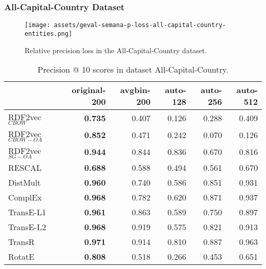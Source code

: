 \documentclass[11pt,titlepage,oneside,openany]{book}
\begin{document}
\newpage

\subsubsection{All-Capital-Country Dataset}
\label{subsubsec:geval-results-semana-all-capital-country-entities}

\begin{figure}[h!]
    \centering
    \texttt{[image: assets/geval-semana-p-loss-all-capital-country-entities.png]}
    \vspace*{-3mm}
    \caption{Relative precision loss in the All-Capital-Country dataset.}
    \label{fig:geval-semana-p-loss-all-capital-country-entities}
\end{figure}


\begin{table}[H]
\centering
\begin{tabular}{lrrrrr}
\toprule
{} &  original-200 &  avgbin-200 &  auto-128 &  auto-256 &  auto-512 \\
\midrule
RDF2vec$_{CBOW}$     &	\textbf{0.735} &       0.407  &     0.126  &     0.288  &     0.409  \\
RDF2vec$_{CBOW-OA}$  &	\textbf{0.852} &       0.471  &     0.242  &     0.070  &     0.126  \\
RDF2vec$_{SG-OA}$    &	\textbf{0.944} &       0.844  &     0.836  &     0.670  &     0.816  \\
RESCAL               &	\textbf{0.688} &       0.588  &     0.494  &     0.561  &     0.670  \\
DistMult             &	\textbf{0.960} &       0.740  &     0.586  &     0.851  &     0.931  \\
ComplEx              &	\textbf{0.968} &       0.782  &     0.620  &     0.871  &     0.937  \\
TransE-L1            &	\textbf{0.961} &       0.863  &     0.589  &     0.750  &     0.897  \\
TransE-L2            &	\textbf{0.968} &       0.919  &     0.575  &     0.821  &     0.913  \\
TransR               &	\textbf{0.971} &       0.914  &     0.810  &     0.887  &     0.963  \\
RotatE               &	\textbf{0.808} &       0.518  &     0.266  &     0.453  &     0.651  \\
\bottomrule
\end{tabular}
\caption{Precision @ 10 scores in dataset All-Capital-Country.}
\label{tab:geval-semana-p-at-10-all-capital-country-entities}
\end{table}
\end{document}
